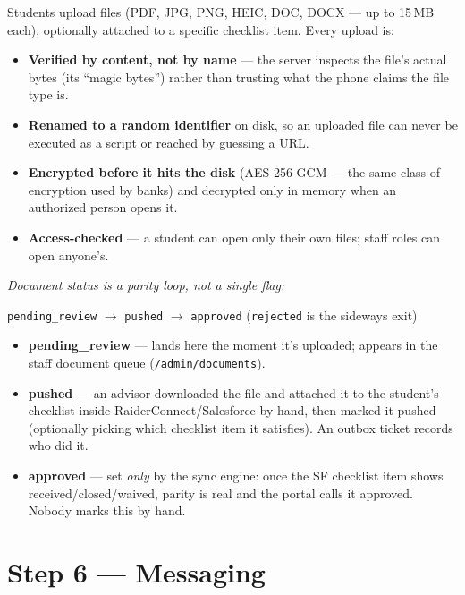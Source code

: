 \documentclass[11pt,letterpaper]{report}
\begin{document}
Students upload files (PDF, JPG, PNG, HEIC, DOC, DOCX --- up to 15\,MB each),
optionally attached to a specific checklist item. Every upload is:

\begin{itemize}[leftmargin=1.4em]
  \item \textbf{Verified by content, not by name} --- the server inspects the
        file's actual bytes (its ``magic bytes'') rather than trusting what the
        phone claims the file type is.
  \item \textbf{Renamed to a random identifier} on disk, so an uploaded file can
        never be executed as a script or reached by guessing a URL.
  \item \textbf{Encrypted before it hits the disk} (AES-256-GCM --- the same
        class of encryption used by banks) and decrypted only in memory when an
        authorized person opens it.
  \item \textbf{Access-checked} --- a student can open only their own files;
        staff roles can open anyone's.
\end{itemize}

\emph{Document status is a parity loop, not a single flag:}

\begin{center}
\texttt{pending\_review} $\rightarrow$ \texttt{pushed} $\rightarrow$
\texttt{approved} \qquad (\texttt{rejected} is the sideways exit)
\end{center}

\begin{itemize}[leftmargin=1.4em]
  \item \textbf{pending\_review} --- lands here the moment it's uploaded; appears
        in the staff document queue (\texttt{/admin/documents}).
  \item \textbf{pushed} --- an advisor downloaded the file and attached it to
        the student's checklist inside RaiderConnect/Salesforce by hand, then
        marked it pushed (optionally picking which checklist item it satisfies).
        An outbox ticket records who did it.
  \item \textbf{approved} --- set \emph{only} by the sync engine: once the SF
        checklist item shows received/closed/waived, parity is real and the
        portal calls it approved. Nobody marks this by hand.
\end{itemize}

\section{Step 6 --- Messaging}
\end{document}
